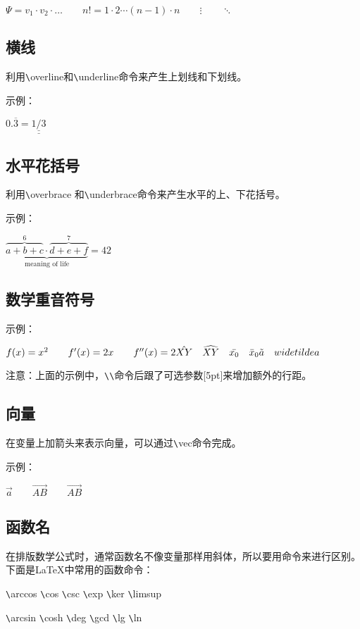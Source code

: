\documentclass[UTF8]{ctexart}
\begin{document}
$\Psi = v_1 \cdot v_2 \cdot \ldots \qquad n! = 1 \cdot 2 \cdots (n-1) \cdot n
\qquad \vdots \qquad \ddots$
\subsection{横线}
利用\texttt{\textbackslash}overline和\texttt{\textbackslash}underline命令来产生上划线和下划线。

示例：

$0.\overline{3} = \underline{\underline{1/3}}$
\subsection{水平花括号}
利用\texttt{\textbackslash}overbrace 和\texttt{\textbackslash}underbrace命令来产生水平的上、下花括号。

示例：

$\underbrace{\overbrace{a+b+c}^6 \cdot \overbrace{d+e+f}^7}_\text{meaning of life} = 42$
\subsection{数学重音符号}
示例：

$f(x) =x^2 \qquad f'(x) =2x \qquad f''(x) = 2\\[5pt]
\hat{XY} \quad \widehat{XY} \quad \bar{x_0} \quad \bar{x}_0\\[5pt]
\tilde{a} \quad widetilde{a}$

注意：上面的示例中，\texttt{\textbackslash}\texttt{\textbackslash}命令后跟了可选参数[5pt]来增加额外的行距。
\subsection{向量}
在变量上加箭头来表示向量，可以通过\texttt{\textbackslash}vec命令完成。

示例：

$\vec{a} \qquad \vec{AB} \qquad \overrightarrow{AB}$

\subsection{函数名}
在排版数学公式时，通常函数名不像变量那样用斜体，所以要用命令来进行区别。下面是\LaTeX 中常用的函数命令：

\texttt{\textbackslash}arccos \qquad \texttt{\textbackslash}cos \qquad \texttt{\textbackslash}csc \qquad \texttt{\textbackslash}exp \qquad \texttt{\textbackslash}ker \qquad \texttt{\textbackslash}limsup

\texttt{\textbackslash}arcsin \qquad \texttt{\textbackslash}cosh \qquad \texttt{\textbackslash}deg \qquad \texttt{\textbackslash}gcd \qquad \texttt{\textbackslash}lg \qquad \texttt{\textbackslash}ln
\end{document}
